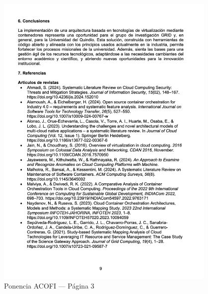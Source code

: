 \begin{figure}[H]
    \centering
    \begin{tcolorbox}[
        colback=white,
        colframe=gray!50,
        boxrule=1pt,
        arc=2pt,
        boxsep=5pt,
        left=3pt,
        right=3pt,
        top=3pt,
        bottom=3pt,
        drop shadow
    ]
        \includegraphics[width=0.95\textwidth,keepaspectratio]{apendices/ACOFI/pagina_3.png}
    \end{tcolorbox}
    \caption{Ponencia ACOFI --- Página 3}\label{fig:acofi-pagina-3}
\end{figure}
\FloatBarrier%
